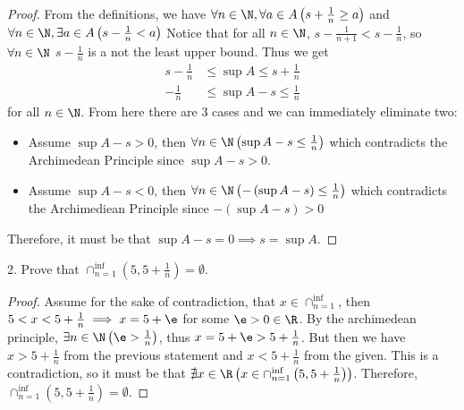 
\begin{proof}
	From the definitions, we have $\forall n \in \N, \forall a \in A \left(s + \frac{1}{n} \ge a \right)$ and $\forall n \in \N, \exists a \in A\left( s - \frac{1}{n} < a \right) $ Notice that for all $n \in \N$, $s - \frac{1}{n + 1} < s - \frac{1}{n}$, so $\forall n \in \N$ $s - \frac{1}{n}$ is a not the least upper bound. Thus we get 
	\begin{align}
		s - \frac{1}{n} &\le \sup A \le s + \frac{1}{n} \\
		- \frac{1}{n}   &\le \sup A - s \le \frac{1}{n}
	\end{align} 
	for all $n \in \N$. From here there are 3 cases and we can immediately eliminate two:
	\begin{itemize}
		\item Assume $\sup A - s > 0$, then $\forall n \in \N \left( \sup A - s \le \frac{1}{n} \right) $ which contradicts the Archimedean Principle since $\sup A - s > 0$.
		\item Assume $\sup A - s < 0$, then $\forall n \in \N \left( -\left( \sup A - s \right)  \le \frac{1}{n} \right) $ which contradicts the Archimediean Principle since $-\left( \sup A - s \right) > 0 $
	\end{itemize}

	Therefore, it must be that $\sup A - s = 0  \implies s = \sup A$.
\end{proof}



2. Prove that $\cap_{n=1}^{\inf}\left( 5, 5+\frac{1}{n} \right) = \emptyset$.

\begin{proof}
	Assume for the sake of contradiction, that $x \in \cap_{n=1}^{\inf}$, then $5 < x < 5 + \frac{1}{n} \implies x = 5 + \e$ for some $\e>0 \in \R$. By the archimedean principle,  $\exists n \in \N\left( \e > \frac{1}{n} \right) $, thus $x = 5 + \e > 5 + \frac{1}{n}$. But then we have $x > 5 + \frac{1}{n}$ from the previous statement and $x < 5 + \frac{1}{n}$ from the given. This is a contradiction, so it must be that $\nexists x \in \R \left( x \in \cap_{n=1}^{\inf} \left( 5, 5 + \frac{1}{n} \right)  \right)  $. Therefore, $\cap_{n=1}^{\inf} \left( 5, 5 + \frac{1}{n} \right) = \emptyset$.
\end{proof}




